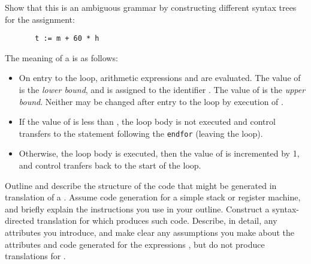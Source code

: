 \begin{subquestions}
\subsubquestion
Show that this is an ambiguous grammar by constructing different
syntax trees for the assignment:
\begin{verbatim}
       t := m + 60 * h
\end{verbatim}
\subquestion
The meaning of a  is as follows:
\begin{itemize}
\item On entry to the loop, arithmetic expressions  and 
        are evaluated. The value of  is the {\em lower
        bound}, and is assigned to the identifier .
        The value of  is the {\em upper bound}.
        Neither may be changed after entry to the loop by 
        execution of .
\item If the value of  is less than ,
        the loop body  is
        not executed and control transfers to the statement following
        the \verb"endfor" (leaving the loop).
\item Otherwise, the loop body  is
        executed,  
        then the value of  is incremented by 1,
        and control tranfers back to the start of the loop.
\end{itemize}
\begin{subsubquestions}
\subsubquestion
	Outline and describe the structure of the
        code that might be generated in translation of
        a .  Assume code generation for a simple
        stack or register machine, and briefly explain the
	instructions you use in your outline.
\subsubquestion
        Construct a syntax-directed translation for 
         which produces such code.
        Describe, in detail, any attributes you
        introduce, and make clear any assumptions you make about 
        the attributes and code generated for the
        expressions , but do not produce translations for
	.
\end{subsubquestions}
\end{subquestions}

\question

